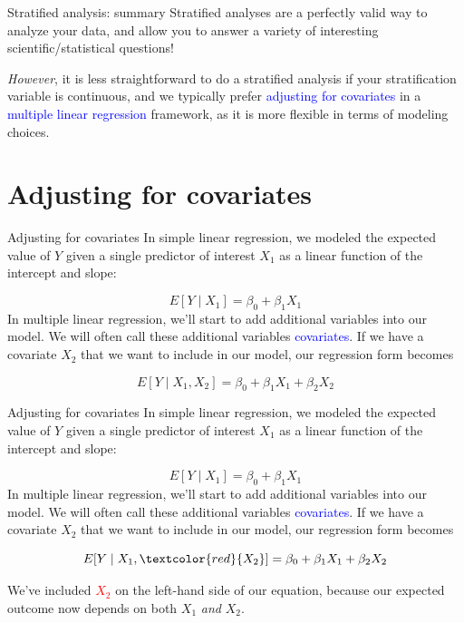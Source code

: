 \documentclass[10pt,t]{beamer}
\begin{document}
\begin{frame}{Stratified analysis: summary}
Stratified analyses are a perfectly valid way to analyze your data, and allow you to answer a variety of interesting scientific/statistical questions!

\vspace{0.3cm}

\textit{However}, it is less straightforward to do a stratified analysis if your stratification variable is continuous, and we typically prefer \textcolor{blue}{adjusting for covariates} in a \textcolor{blue}{multiple linear regression} framework, as it is more flexible in terms of modeling choices.
\end{frame}


\section{Adjusting for covariates}

\begin{frame}{Adjusting for covariates}
In simple linear regression, we modeled the expected value of $Y$ given a single predictor of interest $X_1$ as a linear function of the intercept and slope:

$$
E[Y \mid X_1] = \beta_0 + \beta_1 X_1
$$
\pause
In multiple linear regression, we'll start to add additional variables into our model. We will often call these additional variables \textcolor{blue}{covariates}. If we have a covariate $X_2$ that we want to include in our model, our regression form becomes

$$
E[Y \mid X_1, X_2] = \beta_0 + \beta_1 X_1 + \beta_2 X_2
$$

\end{frame}

\begin{frame}{Adjusting for covariates}
In simple linear regression, we modeled the expected value of $Y$ given a single predictor of interest $X_1$ as a linear function of the intercept and slope:

$$
E[Y \mid X_1] = \beta_0 + \beta_1 X_1
$$
In multiple linear regression, we'll start to add additional variables into our model. We will often call these additional variables \textcolor{blue}{covariates}. If we have a covariate $X_2$ that we want to include in our model, our regression form becomes

$$
E[Y \mid X_1, \textcolor{red}{X_2}] = \beta_0 + \beta_1 X_1 + \beta_2 X_2
$$

We've included \textcolor{red}{$X_2$} on the left-hand side of our equation, because our expected outcome now depends on both $X_1$ \textit{and} $X_2$.

\end{frame}
\end{document}
